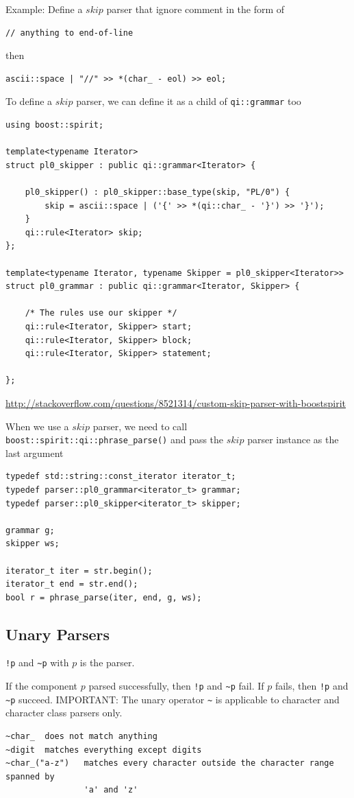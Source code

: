 Example: Define a $skip$ parser that ignore comment in the form of 
\begin{verbatim}
// anything to end-of-line
\end{verbatim}
then
\begin{verbatim}	
ascii::space | "//" >> *(char_ - eol) >> eol;
\end{verbatim}


To define  a $skip$ parser, we can define it as a child of \verb!qi::grammar!
too
\begin{verbatim}
using boost::spirit;

template<typename Iterator>
struct pl0_skipper : public qi::grammar<Iterator> {

    pl0_skipper() : pl0_skipper::base_type(skip, "PL/0") {
        skip = ascii::space | ('{' >> *(qi::char_ - '}') >> '}');
    }
    qi::rule<Iterator> skip;
};

template<typename Iterator, typename Skipper = pl0_skipper<Iterator>>
struct pl0_grammar : public qi::grammar<Iterator, Skipper> {

    /* The rules use our skipper */
    qi::rule<Iterator, Skipper> start;
    qi::rule<Iterator, Skipper> block;
    qi::rule<Iterator, Skipper> statement;

};
\end{verbatim}
\url{http://stackoverflow.com/questions/8521314/custom-skip-parser-with-boostspirit}

When we use a $skip$ parser, we need to call
\verb!boost::spirit::qi::phrase_parse()! and pass the $skip$ parser instance as
the last argument
\begin{verbatim}
typedef std::string::const_iterator iterator_t;
typedef parser::pl0_grammar<iterator_t> grammar;
typedef parser::pl0_skipper<iterator_t> skipper;

grammar g;
skipper ws;

iterator_t iter = str.begin();
iterator_t end = str.end();
bool r = phrase_parse(iter, end, g, ws);
\end{verbatim}


\subsection{Unary Parsers}
\label{sec:unary_parsers}

\verb.!p. and \verb!~p! with $p$ is the parser. 

If the component $p$ parsed successfully, then \verb.!p. and \verb.~p. fail. If
$p$ fails, then \verb.!p. and \verb.~p. succeed. IMPORTANT: The unary operator
\verb.~. is applicable to character and character class parsers only.
\begin{verbatim}
~char_	does not match anything
~digit	matches everything except digits
~char_("a-z")   matches every character outside the character range spanned by
                'a' and 'z'
\end{verbatim}
 
